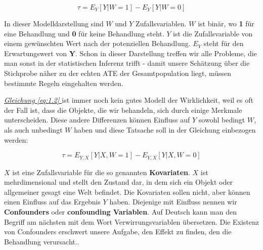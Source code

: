 \documentclass[12pt,a4paper,twoside]{scrartcl}
\numberwithin{equation}{section}
\renewcommand*{\refeq}[1]{\emph{\hyperref[#1]{Gleichung \ref*{#1} }}}
\begin{document}
\begin{equation}\label{eq:1.2}
  \tau = E_Y[Y|W = 1] - E_Y[Y|W = 0]
\end{equation}

\noindent
In dieser Modelldarstellung sind $W$ und $Y$ Zufallsvariablen. $W$ ist binär, wo \textbf{1} für eine Behandlung und \textbf{0} für keine Behandlung steht. $Y$ ist die Zufallsvariable von einem gewünschten Wert nach der potenziellen Behandlung. $E_Y$ steht für den Erwartungswert von \textbf{Y}. Schon in dieser Darstellung treffen wir alle Probleme, die man sonst in der statistischen Inferenz trifft - damit unsere Schätzung über die Stichprobe näher zu der echten ATE der Gesamtpopulation liegt, müssen bestimmte Regeln eingehalten werden.\par

\noindent
\refeq{eq:1.2} ist immer noch kein gutes Modell der Wirklichkeit, weil es oft der Fall ist, dass die Objekte, die wir behandeln, sich durch einige Merkmale unterscheiden. Diese andere Differenzen können Einfluss auf $Y$ sowohl bedingt $W$, als auch unbedingt $W$ haben und diese Tatsache soll in der Gleichung einbezogen werden:\par

\begin{equation}\label{eq:1.3}
  \tau = E_{Y,X}[Y|X,W = 1] - E_{Y,X}[Y|X,W = 0]
\end{equation}       	

\noindent 
$X$ ist eine Zufallsvariable für die so genannten \textbf{Kovariaten}. $X$ ist mehrdimensional und stellt den Zustand dar, in dem sich ein Objekt oder allgemeiner gesagt eine Welt befindet. Die Kovariaten sollen nicht, aber können einen Einfluss auf das Ergebnis $Y$ haben. Diejenige mit Einfluss nennen wir \textbf{Confounders} oder \textbf{confounding Variablen}. Auf Deutsch kann man den Begriff am nächsten mit dem Wort Verwirrungsvariablen übersetzen. Die Existenz von Confounders erschwert unsere Aufgabe, den Effekt zu finden, den die Behandlung verursacht.\cite{vanderweele2013definition}. \par
\end{document}
